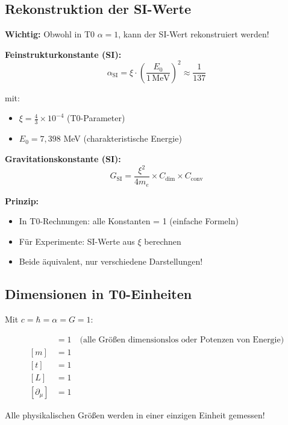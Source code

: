	\subsection{Rekonstruktion der SI-Werte}
	
	\textbf{Wichtig:} Obwohl in T0 $\alpha = 1$, kann der SI-Wert rekonstruiert werden!
	
	\textbf{Feinstrukturkonstante (SI):}
	\begin{equation}
		\alpha_{\text{SI}} = \xi \cdot \left(\frac{E_0}{1\,\text{MeV}}\right)^2 \approx \frac{1}{137}
	\end{equation}
	
	mit:
	\begin{itemize}
		\item $\xi = \frac{4}{3} \times 10^{-4}$ (T0-Parameter)
		\item $E_0 = 7{,}398$ MeV (charakteristische Energie)
	\end{itemize}
	
	\textbf{Gravitationskonstante (SI):}
	\begin{equation}
		G_{\text{SI}} = \frac{\xi^2}{4m_e} \times C_{\text{dim}} \times C_{\text{conv}}
	\end{equation}
	
	\textbf{Prinzip:} 
	\begin{itemize}
		\item In T0-Rechnungen: alle Konstanten = 1 (einfache Formeln)
		\item Für Experimente: SI-Werte aus $\xi$ berechnen
		\item Beide äquivalent, nur verschiedene Darstellungen!
	\end{itemize}
	
	\subsection{Dimensionen in T0-Einheiten}
	
	Mit $c = \hbar = \alpha = G = 1$:
	
	\begin{align}
		[E] &= 1 \quad \text{(alle Größen dimensionslos oder Potenzen von Energie)} \\
		[m] &= 1 \\
		[t] &= 1 \\
		[L] &= 1 \\
		[\partial_\mu] &= 1
	\end{align}
	
	Alle physikalischen Größen werden in einer einzigen Einheit gemessen!
	
